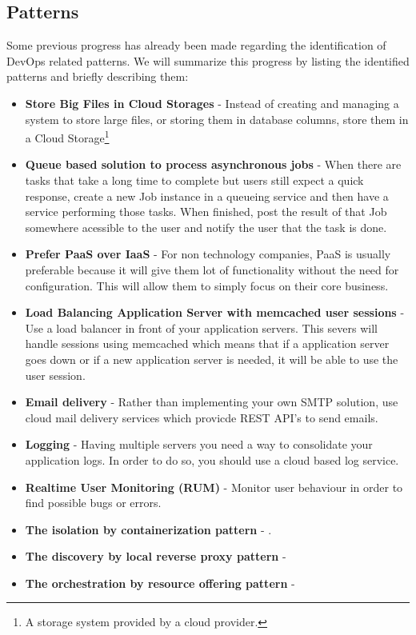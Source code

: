       \subsection{Patterns}
      Some previous progress has already been made regarding the identification of DevOps related patterns. We will summarize this progress by listing the identified patterns and briefly describing them:
      \begin{itemize}
        \item \textbf{Store Big Files in Cloud Storages}\cite{Cukier2013} - Instead of creating and managing a system to store large files, or storing them in database columns, store them in a Cloud Storage\footnote{A storage system provided by a cloud provider.}
        \item \textbf{Queue based solution to process asynchronous jobs}\cite{Cukier2013} - When there are tasks that take a long time to complete but users still expect a quick response, create a new Job instance in a queueing service and then have a service performing those tasks. When finished, post the result of that Job somewhere acessible to the user and notify the user that the task is done.
        \item \textbf{Prefer PaaS over IaaS}\cite{Cukier2013} - For non technology companies, PaaS is usually preferable because it will give them lot of functionality without the need for configuration. This will allow them to simply focus on their core business.
        \item \textbf{Load Balancing Application Server with memcached user sessions}\cite{Cukier2013} - Use a load balancer in front of your application servers. This severs will handle sessions using memcached which means that if a application server goes down or if a new application server is needed, it will be able to use the user session.
        \item \textbf{Email delivery}\cite{Cukier2013} - Rather than implementing your own SMTP solution, use cloud mail delivery services which provicde REST API's to send emails.
        \item \textbf{Logging}\cite{Cukier2013} - Having multiple servers you need a way to consolidate your application logs. In order to do so, you should use a cloud based log service.
        \item \textbf{Realtime User Monitoring (RUM)}\cite{Cukier2013} - Monitor user behaviour in order to find possible bugs or errors.
        \item \textbf{The isolation by containerization pattern} \cite{Sousa2015} - .
        \item \textbf{The discovery by local reverse proxy pattern} \cite{Sousa2015} - 
        \item \textbf{The orchestration by resource offering pattern} \cite{Sousa2015} - 

      \end{itemize}


